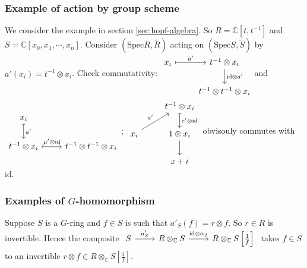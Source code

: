 \documentclass{article}
\theoremstyle{definition}
\newcommand{\Spec}{\mathrm{Spec}}
\newcommand{\ssheaf}[1]{\widetilde{#1}}
\newcommand{\tensorC}[2]{#1\otimes_\mathbb C #2}
\newcommand{\tensor}[2]{#1\otimes#2}
\newcommand{\id}{\mathrm{id}}
\newcommand{\sr}[1]{(\Spec{#1},\ssheaf{#1})}
\begin{document}
\subsubsection{Example of action by group scheme}
We consider the example in section \ref{sec:hopf-algebra}. So $R = \mathbb C[t, t^{-1}]$ and $S=\mathbb C[x_0, x_1,\cdots,x_n]$. Consider $\sr R$ acting on $\sr S$ by $a'(x_i)=\tensor{t^{-1}}{x_i}$. Check commutativity:
$
\begin{tikzcd}
  {x_i}\arrow[r, mapsto, "a'"] & {\tensor{t^{-1}}{x_i}} \arrow[d, "{\tensor\id{a'}}"] \\
  & {\tensor{t^{-1}}{\tensor{t^{-1}}{x_i}}}
\end{tikzcd}
$and $
\begin{tikzcd}
  {x_i}\arrow[d, mapsto, "a'"] \\
  {\tensor{t^{-1}}{x_i}}\arrow[r, mapsto, "{\tensor{\mu'}\id}"] & {\tensor{t^{-1}}{\tensor{t^{-1}}{x_i}}}
\end{tikzcd}
$; $
\begin{tikzcd}
  & {\tensor{t^{-1}}{x_i}}\arrow[d, mapsto, "\tensor{e'}\id"] \\
  {x_i} \arrow[ru, "a'"] & {\tensor1{x_i}} \arrow[d]\\
  & {x+i}
\end{tikzcd}
$ obvisouly commutes with $\id$.

\subsubsection{Examples of $G$-homomorphism}

Suppose $S$ is a $G$-ring and $f\in S$ is such that $a'_S(f)=\tensor r f$. So $r\in R$ is invertible. Hence the composite
$
\begin{tikzcd}
  S \arrow[r, "a_S'"] & \tensorC R S \arrow[r, "\tensor\id{\alpha_f}"] & \tensorC R {S\left[\frac1f\right]}
\end{tikzcd}
$ takes $f\in S$ to an invertible $\tensor r f\in\tensorC R{S\left[\frac1f\right]}$.
\end{document}
